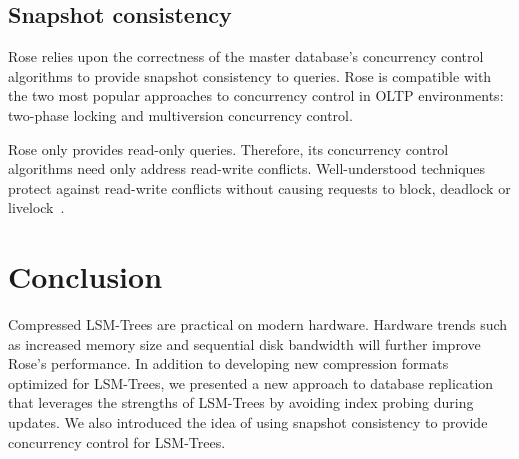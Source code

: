 \documentclass{vldb}
\newcommand{\rows}{Rose\xspace}
\newcommand{\rowss}{Rose's\xspace}
\begin{document}
\subsection{Snapshot consistency}

\rows relies upon the correctness of the master database's concurrency
control algorithms to provide snapshot consistency to queries.  \rows
is compatible with the two most popular approaches to concurrency
control in OLTP environments: two-phase locking and multiversion concurrency control.

\rows only provides read-only queries.  Therefore, its concurrency
control algorithms need only address read-write conflicts.
Well-understood techniques protect against read-write conflicts
without causing requests to block, deadlock or
livelock~\cite{concurrencyControl}.



\section{Conclusion}

Compressed LSM-Trees are practical on modern hardware.  Hardware trends such as increased memory size and sequential disk bandwidth will further improve \rowss performance.  In addition
to developing new compression formats optimized for LSM-Trees, we presented a new approach to
database replication that leverages the strengths of LSM-Trees by
avoiding index probing during updates.  We also introduced the idea of
using snapshot consistency to provide concurrency control for
LSM-Trees.

\end{document}
